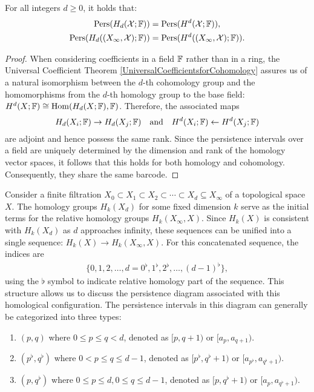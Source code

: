 \begin{theorem}{\cite[Proposition 2.3]{de2011dualities}}
For all integers $d \geq 0$, it holds that:
\begin{align}
\mathrm{Pers}(H_{d}(\mathcal{X};{\mathbb{F}})) &= \mathrm{Pers}(H^{d}(\mathcal{X};{\mathbb{F}})), \\
\mathrm{Pers}(H_{d}((X_{\infty}, \mathcal{X});{\mathbb{F}})) &= \mathrm{Pers}(H^{d}((X_{\infty}, \mathcal{X});{\mathbb{F}})).
\end{align}
\end{theorem}

\begin{proof}
When considering coefficients in a field ${\mathbb{F}}$ rather than in a ring, the Universal Coefficient Theorem \ref{UniversalCoefficientsforCohomology} assures us of a natural isomorphism between the $d$-th cohomology group and the homomorphisms from the $d$-th homology group to the base field: $H^{d}(X; {\mathbb{F}}) \cong \operatorname{Hom}(H_{d}(X; {\mathbb{F}}), {\mathbb{F}})$. Therefore, the associated maps
\begin{equation}
H_{d}(X_{i}; {\mathbb{F}}) \rightarrow H_{d}(X_{j}; {\mathbb{F}}) \quad \text{and} \quad H^{d}(X_{i}; {\mathbb{F}}) \leftarrow H^{d}(X_{j}; {\mathbb{F}})
\end{equation}
are adjoint and hence possess the same rank. Since the persistence intervals over a field are uniquely determined by the dimension and rank of the homology vector spaces, it follows that this holds for both homology and cohomology. Consequently, they share the same barcode.
\end{proof}

Consider a finite filtration $X_{0} \subset X_{1} \subset X_{2} \subset \cdots \subset X_d \subseteq X_{\infty}$ of a topological space $X$. The homology groups $H_{k}(X_{d})$ for some fixed dimension $k$ serve as the initial terms for the relative homology groups $H_{k}(X_{\infty}, X)$. Since $H_{k}(X)$ is consistent with $H_{k}(X_{d})$ as $d$ approaches infinity, these sequences can be unified into a single sequence: $H_{k}(X) \to H_{k}(X_{\infty}, X)$. For this concatenated sequence, the indices are 
\begin{align}
\{0, 1, 2, \ldots, d = 0^{\flat}, 1^{\flat}, 2^{\flat}, \ldots, (d-1)^{\flat}\},
\end{align}
using the $\flat$ symbol to indicate relative homology part of the sequence. This structure allows us to discuss the persistence diagram associated with this homological configuration. The persistence intervals in this diagram can generally be categorized into three types:
\begin{enumerate}
	\item $(p, q)$ where $0 \leq p \leq q < d$, denoted as $[p, q+1)$ or $[a_{p}, a_{q+1})$.
	\item $(p^{\flat}, q^{\flat})$ where $0 < p \leq q \leq d-1$, denoted as $[p^{\flat}, q^{\flat}+1)$ or $[a_{p^\flat}, a_{q^\flat+1})$.
	\item $(p, q^{\flat})$ where $0 \leq p \leq d, 0 \leq q \leq d-1$, denoted as $[p, q^{\flat}+1)$ or $[a_{p}, a_{q^\flat+1})$.
\end{enumerate}

